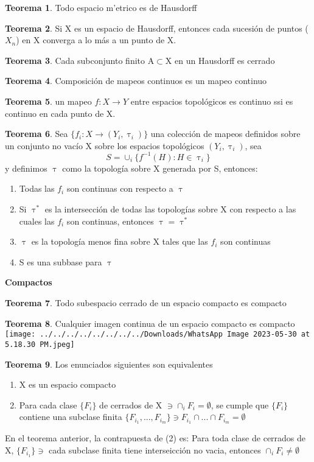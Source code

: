 \documentclass{article}
\theoremstyle{definition}
\newtheorem{theorem}{Teorema}[section]
\begin{document}
\begin{theorem}
	Todo espacio m'etrico es de Hausdorff 
\end{theorem}
\begin{theorem}
	Si X es un espacio de Hausdorff, entonces cada sucesión de puntos ($X_n$) en X converga a lo más a un punto de X.
\end{theorem}
\begin{theorem}
	Cada subconjunto finito A$\subset$X en un Hausdorff es cerrado
\end{theorem}
\begin{theorem}
	Composición de mapeos continuos es un mapeo continuo
\end{theorem}
\begin{theorem}
	 un mapeo $f:X\to Y$ entre espacios topológicos es continuo ssi es continuo en cada punto de X.
\end{theorem}
\begin{theorem}
	Sea $\{f_i:X\to(Y_i,\uptau_i)\}$ una colección de mapeos definidos sobre un conjunto no vacío X sobre los espacios topológicos $(Y_i,\uptau_i)$, sea 
	\[S=\cup_i \{f^{-1}(H):H\in\uptau_i\}\]
	y definimos $\uptau$ como la topología sobre X generada por S, entonces:
	\begin{enumerate}
	\item Todas las $f_i$ son continuas con respecto a $\uptau$
	\item Si $\uptau^*$ es la intersección de todas las topologías sobre X con respecto a las cuales las $f_i$ son continuas, entonces $\uptau=\uptau^*$
	\item $\uptau$ es la topología menos fina sobre X tales que las $f_i$ son continuas
	\item S es una subbase para $\uptau$
	\end{enumerate}
\end{theorem}
\textbf{Compactos}
\begin{theorem}
	Todo subespacio cerrado de un espacio compacto es compacto
\end{theorem}
\begin{theorem}
	Cualquier imagen continua de un espacio compacto es compacto\\
	\texttt{[image: ../../../../../../../../Downloads/WhatsApp Image 2023-05-30 at 5.18.30 PM.jpeg]} 
\end{theorem}
\begin{theorem}
	Los enunciados siguientes son equivalentes
	\begin{enumerate}
	\item X es un espacio compacto
	\item Para cada clase $\{F_i\}$ de cerrados de X $\ni\cap_iF_i=\emptyset$, se cumple que $\{F_i\}$ contiene una subclase finita $\{F_{i_1},...,F_{i_m}\}\ni F_{i_1}\cap ...\cap F_{i_m}=\emptyset$
\end{enumerate}
En el teorema anterior, la contrapuesta de (2) es: Para toda clase de cerrados de X, $\{F_{i_1}\}\ni$ cada subclase finita tiene interseicción no vacia, entonces $\cap_iF_i\neq\emptyset$ 
\end{theorem}
\end{document}
